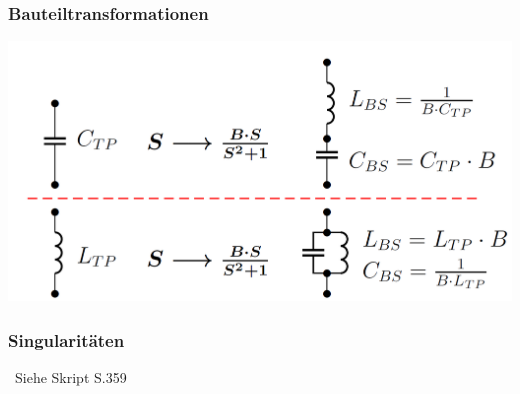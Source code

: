 \begin{minipage}[t]{0.48\columnwidth}
    \subsubsection{Bauteiltransformationen}
    \includegraphics[width=\columnwidth]{images/bauteiltransformation_TP_BS.png}
\end{minipage}
\hfill
\begin{minipage}[t]{0.48\columnwidth}
    \subsubsection{Singularitäten}

    \textrightarrow\ Siehe Skript S.359
\end{minipage}

